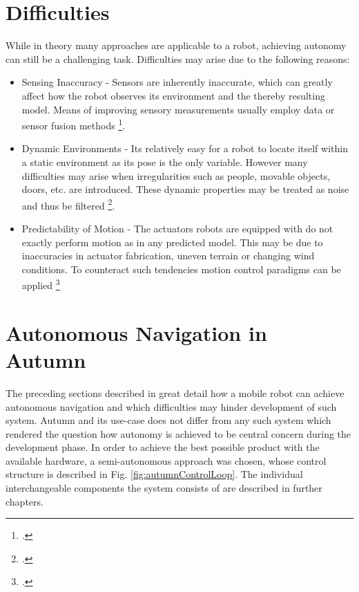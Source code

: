 \section{Difficulties}
While in theory many approaches are applicable to a robot, achieving autonomy can still be a challenging task. Difficulties may arise due to the following reasons:
\begin{itemize}
	\item Sensing Inaccuracy - Sensors are inherently inaccurate, which can greatly affect how the robot observes its environment and the thereby resulting model. Means of improving sensory measurements usually employ data or sensor fusion methods \footcite[Page 585]{siciliano2008springer}.
	\item Dynamic Environments - Its relatively easy for a robot to locate itself within a static environment as its pose is the only variable. However many difficulties may arise when irregularities such as people, movable objects, doors, etc. are introduced. These dynamic properties may be treated as noise and thus be filtered \footcite[Pages 159 - 162]{thrun2002probabilisticRobotics}.
	\item Predictability of Motion - The actuators robots are equipped with do not exactly perform motion as in any predicted model. This may be due to inaccuracies in actuator fabrication, uneven terrain or changing wind conditions. To counteract such tendencies motion control paradigms can be applied \footcite[Page 133]{siciliano2008springer}
\end{itemize}

\section{Autonomous Navigation in Autumn}\label{autumnControlLoop}
The preceding sections described in great detail how a mobile robot can achieve autonomous navigation and which difficulties may hinder development of such system. Autumn and its use-case does not differ from any such system which rendered the question how autonomy is achieved to be central concern during the development phase. 
In order to achieve the best possible product with the available hardware, a semi-autonomous approach was chosen, whose control structure is described in Fig. \ref{fig:autumnControlLoop}.
The individual interchangeable components the system consists of are described in further chapters.


